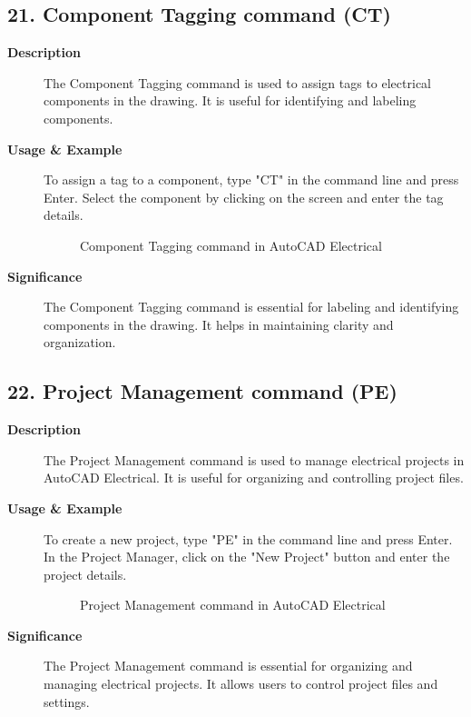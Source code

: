 \documentclass[12pt]{article}
\begin{document}
\subsection*{21. Component Tagging command (CT)}
\begin{description}
    \item [\textbf{Description}] The Component Tagging command is used to assign tags to electrical components in the drawing. It is useful for identifying and labeling components.
    \item [\textbf{Usage \& Example}]To assign a tag to a component, type "CT" in the command line and press Enter. Select the component by clicking on the screen and enter the tag details.
          \begin{figure}[H]
              \centering
              \caption{Component Tagging command in AutoCAD Electrical}
          \end{figure}
    \item [\textbf{Significance}] The Component Tagging command is essential for labeling and identifying components in the drawing. It helps in maintaining clarity and organization.
\end{description}

\subsection*{22. Project Management command (PE)}
\begin{description}
    \item [\textbf{Description}] The Project Management command is used to manage electrical projects in AutoCAD Electrical. It is useful for organizing and controlling project files.
    \item [\textbf{Usage \& Example}]To create a new project, type "PE" in the command line and press Enter. In the Project Manager, click on the "New Project" button and enter the project details.
          \begin{figure}[H]
              \centering
              \caption{Project Management command in AutoCAD Electrical}
          \end{figure}
    \item [\textbf{Significance}] The Project Management command is essential for organizing and managing electrical projects. It allows users to control project files and settings.
\end{description}
\end{document}
